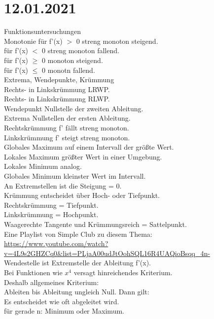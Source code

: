 \documentclass{article}
\begin{document}
	\section*{12.01.2021}
	Funktionsuntersuchungen \\
	Monotonie
	für f'(x) $>$ 0 streng monoton steigend. \\
	für f'(x) $<$ 0 streng monoton fallend. \\
	für f'(x) $\geq$ 0 monoton steigend. \\
	für f'(x) $\leq$ 0 monotn fallend. \\
	Extrema, Wendepunkte, Krümmung \\
	Rechts- in Linkskrümmung LRWP. \\
	Rechts- in Linkskrümmung RLWP. \\
	Wendepunkt Nullstelle der zweiten Ableitung. \\
	Extrema Nullstellen der ersten Ableitung. \\
	Rechtskrümmung f' fällt streng monoton. \\
	Linkskrümmung f' steigt streng monoton. \\
	Globales Maximum auf einem Intervall der größte Wert. \\
	Lokales Maximum größter Wert in einer Umgebung. \\
	Lokales Minimum analog. \\
	Globales Minimum kleinster Wert im Intervall. \\
	An Extremstellen ist die Steigung = 0. \\
	Krümmung entscheidet über Hoch- oder Tiefpunkt. \\
	Rechtskrümmung = Tiefpunkt. \\
	Linkskrümmung = Hochpunkt. \\
	Waagerechte Tangente und Krümmungsreich = Sattelpunkt. \\
	Eine Playlist von Simple Club zu diesem Thema: \url{https://www.youtube.com/watch?v=4L9s2GHZCq0&list=PLjaA00udJtOohSQL16R4UAQioBsqq_4n-} \\
	Wendestelle ist Extremstelle der Ableitung f'(x). \\
	Bei Funktionen wie $x^4$ versagt hinreichendes Kriterium. \\
	Deshalb allgemeines Kriterium: \\
	Ableiten bis Ableitung ungleich Null. Dann gilt: \\
	Es entscheidet wie oft abgeleitet wird. \\
	für gerade n: Minimum oder Maximum.\\
\end{document}
